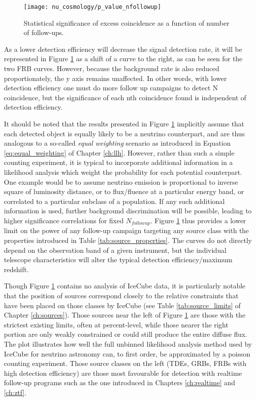 \begin{figure}[!ht]
	\centering \texttt{[image: nu\_cosmology/p\_value\_nfollowup]}
	\caption{Statistical significance of excess coincidence as a function of number of follow-ups.}
	\label{fig:p_value}
\end{figure}

As a lower detection efficiency will decrease the signal detection rate,  it will be represented in Figure \ref{fig:p_value} as a shift of a curve to the right,  as can be seen for the two FRB curves. However, because the background rate is also reduced proportionately, the y axis remains unaffected. In other words, with lower detection efficiency one must do more follow up campaigns to detect N coincidence, but the significance of each nth coincidence found is independent of detection efficiency.

It should be noted that the results presented in Figure \ref{fig:p_value} implicitly assume that each detected object is equally likely to be a neutrino counterpart, and are thus analogous to a so-called \emph{equal weighting} scenario as introduced in Equation \ref{eq:equal_weighting} of Chapter \ref{ch:llh}. However, rather than such a simple counting experiment, it is typical to incorporate additional information in a likelihood analysis which weight the probability for each potential counterpart. One example would be to assume neutrino emission is proportional to inverse square of luminosity distance, or to flux/fluence at a particular energy band, or correlated to a particular subclass of a population. If any such additional information is used, further background discrimination will be possible, leading to higher significance correlations for fixed $N_{followup}$. Figure \ref{fig:p_value} thus provides a lower limit on the power of any follow-up campaign targeting any source class with the properties introduced in Table \ref{tab:source_properties}. The curves do not directly depend on the observation band of a given instrument, but the individual telescope characteristics will alter the typical detection efficiency/maximum redshift. 

Though Figure \ref{fig:p_value} contains no analysis of IceCube data, it is particularly notable that the position of sources correspond closely to the relative constraints that have been placed on those classes by IceCube (see Table \ref{tab:source_limits} of Chapter \ref{ch:sources}). Those sources near the left of Figure \ref{fig:p_value} are those with the strictest existing limits, often at percent-level, while those nearer the right portion are only weakly constrained or could still produce the entire diffuse flux. The plot illustrates how well the full unbinned likelihood analysis method used by IceCube for neutrino astronomy can, to first order, be approximated by a poisson counting experiment. Those source classes on the left (TDEs, GRBs, FRBs with high detection efficiency) are those most favourable for detection with realtime follow-up programs such as the one introduced in Chapters \ref{ch:realtime} and \ref{ch:ztf}. 

